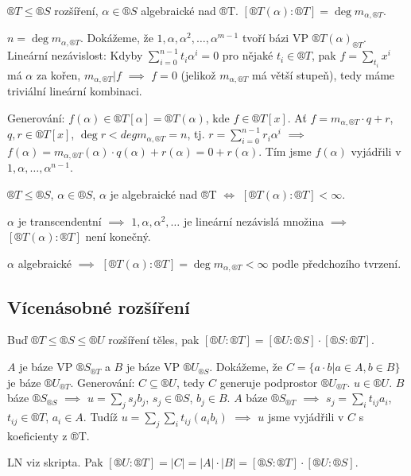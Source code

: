 \documentclass[12pt]{article}                   %
\begin{document}
        \begin{tvrzeni}
            $®T ≤ ®S$ rozšíření, $\alpha \in ®S$ algebraické nad ®T. $[®T(\alpha):®T] = \deg m_{\alpha, ®T}$.

            \begin{dukazin}
                $n = \deg m_{\alpha, ®T}$. Dokážeme, že $1, \alpha, \alpha^2, …, \alpha^{m-1}$ tvoří bázi VP $®T(\alpha)_{®T}$. Lineární nezávislost: Kdyby $\sum_{i=0}^{n-1}t_i\alpha^i = 0$ pro nějaké $t_i \in ®T$, pak $f = \sum_{t_i}x^i$ má $\alpha$ za kořen, $m_{\alpha, ®T} | f$ $\implies$ $f = 0$ (jelikož $m_{\alpha, ®T}$ má větší stupeň), tedy máme triviální lineární kombinaci.

                Generování: $f(\alpha) \in ®T[\alpha] = ®T(\alpha)$, kde $f \in ®T[x]$. Ať $f = m_{\alpha, ®T} · q + r$, $q, r \in ®T[x]$, $\deg r < deg m_{\alpha, ®T} = n$, tj. $r = \sum_{i = 0}^{n-1} r_i\alpha^i$ $\implies$ $f(\alpha) = m_{\alpha, ®T}(\alpha)·q(\alpha) + r(\alpha) = 0 + r(\alpha)$. Tím jsme $f(\alpha)$ vyjádřili v $1, \alpha, …, \alpha^{n-1}$.
            \end{dukazin}
        \end{tvrzeni}

        \begin{dusledek}
            $®T ≤ ®S$, $\alpha \in ®S$, $\alpha$ je algebraické nad ®T $\Leftrightarrow$ $[®T(\alpha):®T] < ∞$.

            \begin{dukazin}
                $\alpha$ je transcendentní $\implies$ $1, \alpha, \alpha^2, …$ je lineární nezávislá množina $\implies$ $[®T(\alpha):®T]$ není konečný.

                $\alpha$ algebraické $\implies$ $[®T(\alpha):®T] = \deg m_{\alpha, ®T} < ∞$ podle předchozího tvrzení.
            \end{dukazin}
        \end{dusledek}

    \subsection{Vícenásobné rozšíření}
        \begin{tvrzeni}
            Buď $®T ≤ ®S ≤ ®U$ rozšíření těles, pak $[®U:®T] = [®U:®S]·[®S:®T]$.

            \begin{dukazin}
                $A$ je báze VP $®S_{®T}$ a $B$ je báze VP $®U_{®S}$. Dokážeme, že $C = \{a·b | a \in A, b \in B\}$ je báze $®U_{®T}$. Generování: $C \subseteq ®U$, tedy $C$ generuje podprostor $®U_{®T}$. $u \in ®U$. $B$ báze $®S_{®S}$ $\implies$ $u = \sum_j s_jb_j$, $s_j \in ®S$, $b_j \in B$. $A$ báze $®S_{®T}$ $\implies$ $s_j = \sum_i t_{ij}a_i$, $t_{ij}\in ®T$, $a_i \in A$. Tudíž $u = \sum_j\sum_i t_{ij}(a_ib_i)$ $\implies$ $u$ jsme vyjádřili v $C$ s koeficienty z ®T.

                LN viz skripta. Pak $[®U:®T] = |C| = |A|·|B| = [®S:®T]·[®U:®S]$.
            \end{dukazin}
        \end{tvrzeni}
\end{document}
